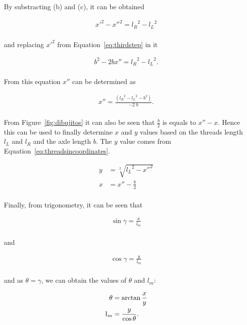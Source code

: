 \documentclass[journal]{IEEEtran}
\begin{document}
By substracting (b) and (c), it can be obtained

\begin{align*}
{x'}^2 - {x'' }^2 = {l_R}^2 - {l_L}^2 \\
\end{align*}

and replacing ${x'}^2$ from Equation~\ref{eq:thirdstep} in it

\begin{align*}
b^2 - 2 b {x''}= {l_R}^2 - {l_L}^2. \\
\end{align*}


From this equation $x''$ can be determined as

\begin{align*}
x'' = \frac{({l_R}^2 - {l_L}^2 - b^2)}{-2 \; b}.    \\
\end{align*}

From Figure~\ref{fig:dibujitos} it can also be seen that $\frac{b}{2}$ is equals to $x'' - x$.  Hence this can be used to finally determine $x$ and $y$ values based on the threads length $l_L$ and $l_R$ and the axle length $b$.  The $y$ value comes from Equation~\ref{eq:threadsincoordinates}.

\begin{align*}
y &= \sqrt[2]{{l_L}^2 - {x''}^2 } \\
x &= x'' - \frac{b}{2}\\
\end{align*}

Finally, from trigonometry, it can be seen that

\begin{align*}
\sin{\gamma} = \frac{x}{l_m}\\
\end{align*}

and 

\begin{align*}
\cos{\gamma} = \frac{y}{l_m}\\
\end{align*}

\noindent and as $\theta = \gamma$, we can obtain the values of $\theta$ and $l_m$:

\begin{align*}
\theta &= \arctan{ \frac{x}{y}} \\
\l_m    &= \frac{y}{\cos{\theta}}. \\
\end{align*}
\end{document}
